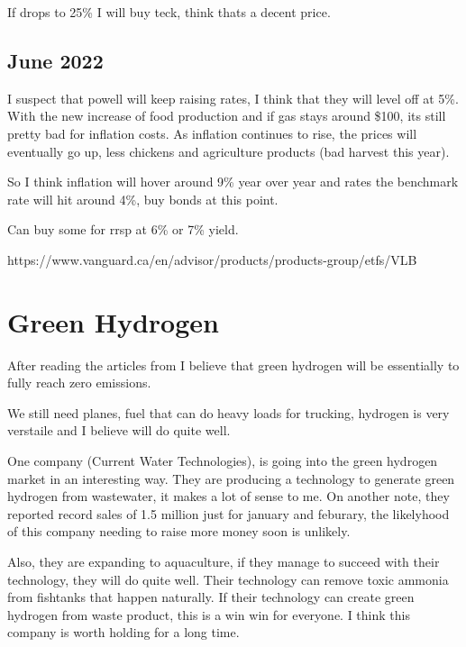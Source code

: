 If drops to 25\% I will buy teck, think thats a decent price.

\subsection{June 2022}

I suspect that powell will keep raising rates, I think that they will level off at 5\%. With the new increase of food production and if gas stays around \$100, its still pretty bad for inflation costs. As inflation continues to rise, the prices will eventually go up, less chickens and agriculture products (bad harvest this year).

So I think inflation will hover around 9\% year over year and rates the benchmark rate will hit around 4\%, buy bonds at this point.

Can buy some for rrsp at 6\% or 7\% yield.

https://www.vanguard.ca/en/advisor/products/products-group/etfs/VLB

\section{Green Hydrogen}
After reading the articles from \cite{goldman_sachs_hydrogen_2022} I believe that green hydrogen will be essentially to fully reach zero emissions.

We still need planes, fuel that can do heavy loads for trucking, hydrogen is very verstaile and I believe will do quite well.

One company  (Current Water Technologies), is going into the green hydrogen market in an interesting way. They are producing a technology to generate green hydrogen from wastewater, it makes a lot of sense to me. On another note, they reported record sales of 1.5 million just for january and feburary, the likelyhood of this company needing to raise more money soon is unlikely.

Also, they are expanding to aquaculture, if they manage to succeed with their technology, they will do quite well. Their technology can remove toxic ammonia from fishtanks that happen naturally. If their technology can create green hydrogen from waste product, this is a win win for everyone. I think this company is worth holding for a long time.


